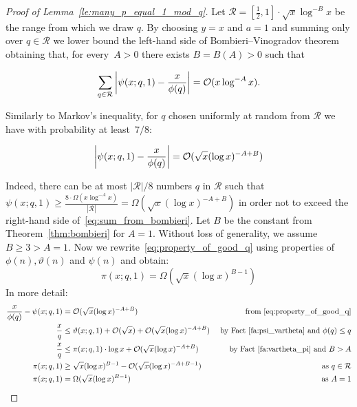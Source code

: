 \begin{proof}[Proof of Lemma~\ref{le:many_p_equal_1_mod_q}]

Let $\mathcal{R}=[\frac12,1]\cdot \sqrt{x}\log^{-B} x$ be the range from which we draw $q$.
By choosing $y=x$ and $a=1$ and summing only over $q\in\mathcal{R}$ we lower bound the left-hand side of Bombieri--Vinogradov theorem obtaining that, for every~$A>0$ there exists $B=B(A)>0$ such that 

\begin{equation}\label{eq:sum_from_bombieri}
\sum_{q \in \mathcal{R}} \left| \psi(x;q,1) - \frac{x}{\phi(q)}\right| = \mathcal{O}(x\log^{-A} x).  
\end{equation}


\noindent Similarly to Markov's inequality, for $q$ chosen uniformly at random from $\mathcal{R}$ we have with probability at least~$7/8$:

\begin{equation}\label{eq:property_of_good_q}
\left| \psi(x;q,1) - \frac{x}{\phi(q)}\right| = \mathcal{O}(\sqrt{x}(\log x)^{-A+B}) 
\end{equation}

Indeed, there can be at most $|\mathcal{R}|/8$ numbers $q$ in $\mathcal{R}$ such that $\psi(x;q,1)\geq \frac{8\cdot\Omega(x\log^{-A} x)}{|\mathcal{R}|}=\Omega(\sqrt{x}(\log x)^{-A+B})$ in order not to exceed the right-hand side of~\eqref{eq:sum_from_bombieri}.
Let $B$ be the constant from Theorem~\ref{thm:bombieri} for $A=1$. 
Without loss of generality, we assume $B\geq 3>A=1$.
Now we rewrite~\eqref{eq:property_of_good_q} using properties of $\phi(n),\vartheta(n)$ and $\psi(n)$ and obtain:
\[
\pi(x;q,1) = \Omega(\sqrt{x}(\log x)^{B-1})
\]
In more detail:
\begin{align*}
 \frac{x}{\phi(q)} - \psi(x;q,1) &= \mathcal{O}(\sqrt x (\log x)^{-A+B}) & \text{ from~\eqref{eq:property_of_good_q}} \\
 \frac xq & \le \vartheta(x;q,1) + \mathcal{O}(\sqrt x) + \mathcal{O}(\sqrt x (\log x)^{-A+B}) & \text{ by Fact~\ref{fa:psi_vartheta} and }\phi(q)\leq q \\
 \frac xq & \le \pi(x;q,1)\cdot\log x + \mathcal{O}(\sqrt x (\log x)^{-A+B}) & \text{by Fact \ref{fa:vartheta_pi} and } B > A \\
 \pi(x;q,1) & \ge  \sqrt x (\log x)^{B-1}  - \mathcal{O}(\sqrt x (\log x)^{-A+B-1}) & \text{ as } q\in\mathcal{R} \\
 \pi(x;q,1) &= \Omega(\sqrt{x}(\log x)^{B-1}) & \text{ as } A=1 \\
\end{align*}
\end{proof}

